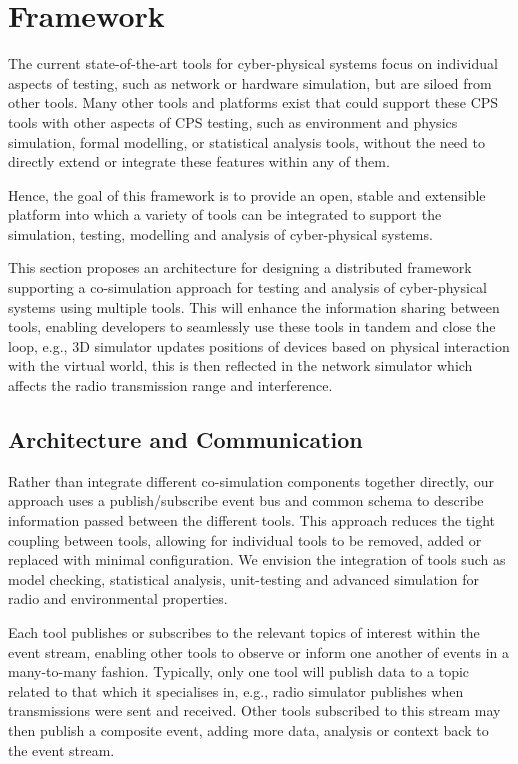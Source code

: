 \chapter{Framework}
\label{sec:framework}
The current state-of-the-art tools for cyber-physical systems focus on individual aspects of testing, such as network or hardware simulation, but are siloed from other tools. Many other tools and platforms exist that could support these CPS tools with other aspects of CPS testing, such as environment and physics simulation, formal modelling, or statistical analysis tools, without the need to directly extend or integrate these features within any of them. 

Hence, the goal of this framework is to provide an open, stable and extensible platform into which a variety of tools can be integrated to support the simulation, testing, modelling and analysis of cyber-physical systems.

This section proposes an architecture for designing a distributed framework supporting a co-simulation approach for testing and analysis of cyber-physical systems using multiple tools.
This will enhance the information sharing between tools, enabling developers to seamlessly use these tools in tandem and close the loop, e.g., 3D simulator updates positions of devices based on physical interaction with the virtual world, this is then reflected in the network simulator which affects the radio transmission range and interference.

\section{Architecture and Communication} %
\label{sub:architecture}
Rather than integrate different co-simulation components together directly, our approach uses a publish/subscribe event bus and common schema to describe information passed between the different tools. This approach reduces the tight coupling between tools, allowing for individual tools to be removed, added or replaced with minimal configuration. We envision the integration of tools such as model checking, statistical analysis, unit-testing and advanced simulation for radio and environmental properties.

Each tool publishes or subscribes to the relevant topics of interest within the event stream, enabling other tools to observe or inform one another of events in a many-to-many fashion. Typically, only one tool will publish data to a topic related to that which it specialises in, e.g., radio simulator publishes when transmissions were sent and received. Other tools subscribed to this stream may then publish a composite event, adding more data, analysis or context back to the event stream.

